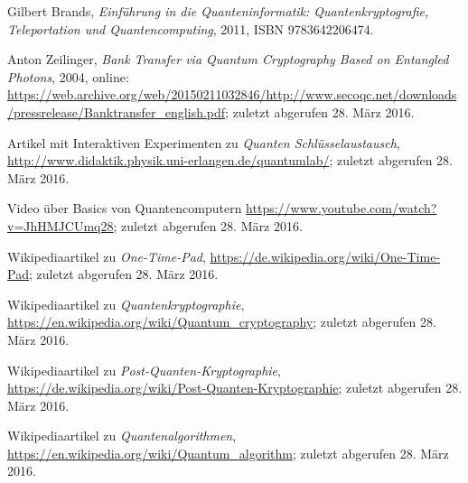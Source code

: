 \documentclass[letterpaper, 12pt]{article}
\begin{document}
\parindent 0pt
\parskip 6pt



\clearpage
\thispagestyle{empty}
\tableofcontents

\newpage
{}
\pagestyle{fancy}



\newpage



\clearpage

\begin{thebibliography}{9}

    Gilbert Brands,
    \emph{Einführung in die Quanteninformatik: Quantenkryptografie, Teleportation und Quantencomputing},
    2011,
    ISBN 9783642206474.
    
    Anton Zeilinger,
    \emph{Bank Transfer via Quantum Cryptography Based on Entangled Photons}, 
    2004, 
    online: \url{https://web.archive.org/web/20150211032846/http://www.secoqc.net/downloads/pressrelease/Banktransfer_english.pdf};
    zuletzt abgerufen 28. März 2016.
    
    Artikel mit Interaktiven Experimenten zu \emph{Quanten Schlüsselaustausch},
    \url{http://www.didaktik.physik.uni-erlangen.de/quantumlab/};
    zuletzt abgerufen 28. März 2016.
    
    Video über Basics von Quantencomputern
    \url{https://www.youtube.com/watch?v=JhHMJCUmq28};
    zuletzt abgerufen 28. März 2016.
    
    Wikipediaartikel zu \emph{One-Time-Pad},
    \url{https://de.wikipedia.org/wiki/One-Time-Pad};
    zuletzt abgerufen 28. März 2016.
    
    Wikipediaartikel zu \emph{Quantenkryptographie},
    \url{https://en.wikipedia.org/wiki/Quantum_cryptography};
    zuletzt abgerufen 28. März 2016.
    
    Wikipediaartikel zu \emph{Post-Quanten-Kryptographie},
    \url{https://de.wikipedia.org/wiki/Post-Quanten-Kryptographie};
    zuletzt abgerufen 28. März 2016.
    
    Wikipediaartikel zu \emph{Quantenalgorithmen},
    \url{https://en.wikipedia.org/wiki/Quantum_algorithm};
    zuletzt abgerufen 28. März 2016.

\end{thebibliography}

\listoffigures
\end{document}
